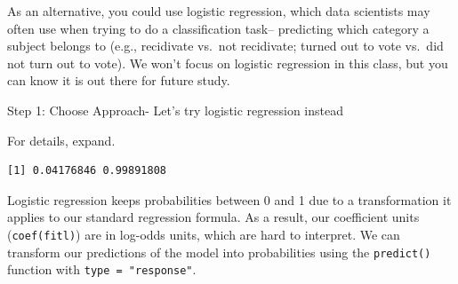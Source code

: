 \documentclass[
  letterpaper,
  DIV=11,
  numbers=noendperiod]{scrreprt}
\newenvironment{Shaded}{\begin{snugshade}}{\end{snugshade}}
\newcommand{\AttributeTok}[1]{\textcolor[rgb]{0.40,0.45,0.13}{#1}}
\newcommand{\CommentTok}[1]{\textcolor[rgb]{0.37,0.37,0.37}{#1}}
\newcommand{\DocumentationTok}[1]{\textcolor[rgb]{0.37,0.37,0.37}{\textit{#1}}}
\newcommand{\FunctionTok}[1]{\textcolor[rgb]{0.28,0.35,0.67}{#1}}
\newcommand{\NormalTok}[1]{\textcolor[rgb]{0.00,0.23,0.31}{#1}}
\newcommand{\OtherTok}[1]{\textcolor[rgb]{0.00,0.23,0.31}{#1}}
\newcommand{\SpecialCharTok}[1]{\textcolor[rgb]{0.37,0.37,0.37}{#1}}
\newcommand{\StringTok}[1]{\textcolor[rgb]{0.13,0.47,0.30}{#1}}
\begin{document}
As an alternative, you could use logistic regression, which data
scientists may often use when trying to do a classification task--
predicting which category a subject belongs to (e.g., recidivate vs.~not
recidivate; turned out to vote vs.~did not turn out to vote). We won't
focus on logistic regression in this class, but you can know it is out
there for future study.

Step 1: Choose Approach- Let's try logistic regression instead

For details, expand.

\begin{Shaded}
\end{Shaded}

\begin{verbatim}
[1] 0.04176846 0.99891808
\end{verbatim}

Logistic regression keeps probabilities between 0 and 1 due to a
transformation it applies to our standard regression formula. As a
result, our coefficient units (\texttt{coef(fitl)}) are in log-odds
units, which are hard to interpret. We can transform our predictions of
the model into probabilities using the \texttt{predict()} function with
\texttt{type\ =\ "response"}.
\end{document}
